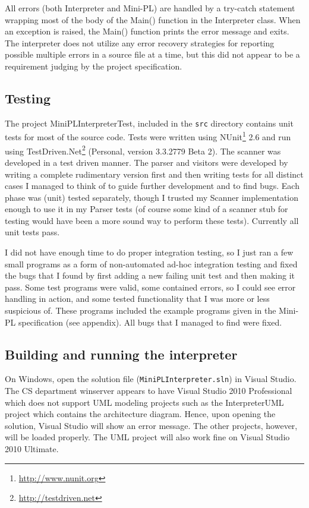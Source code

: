 \documentclass[a4paper,11pt]{article}
\begin{document}
All errors (both Interpreter and Mini-PL) are handled by a try-catch statement wrapping most of the body of the Main() function in the Interpreter class. When an exception is raised, the Main() function prints the error message and exits. The interpreter does not utilize any error recovery strategies for reporting possible multiple errors in a source file at a time, but this did not appear to be a requirement judging by the project specification.

\subsection{Testing}

The project MiniPLInterpreterTest, included in the \verb,src, directory contains unit tests for most of the source code. Tests were written using NUnit\footnote{\url{http://www.nunit.org}} 2.6 and run using TestDriven.Net\footnote{\url{http://testdriven.net}} (Personal, version 3.3.2779 Beta 2). The scanner was developed in a test driven manner. The parser and visitors were developed by writing a complete rudimentary version first and then writing tests for all distinct cases I managed to think of to guide further development and to find bugs. Each phase was (unit) tested separately, though I trusted my Scanner implementation enough to use it in my Parser tests (of course some kind of a scanner stub for testing would have been a more sound way to perform these tests). Currently all unit tests pass.

I did not have enough time to do proper integration testing, so I just ran a few small programs as a form of non-automated ad-hoc integration testing and fixed the bugs that I found by first adding a new failing unit test and then making it pass. Some test programs were valid, some contained errors, so I could see error handling in action, and some tested functionality that I was more or less suspicious of. These programs included the example programs given in the Mini-PL specification (see appendix). All bugs that I managed to find were fixed.

\subsection{Building and running the interpreter}

On Windows, open the solution file (\verb,MiniPLInterpreter.sln,) in Visual Studio. The CS department winserver appears to have Visual Studio 2010 Professional which does not support UML modeling projects such as the InterpreterUML project which contains the architecture diagram. Hence, upon opening the solution, Visual Studio will show an error message. The other projects, however, will be loaded properly. The UML project will also work fine on Visual Studio 2010 Ultimate.
\end{document}
